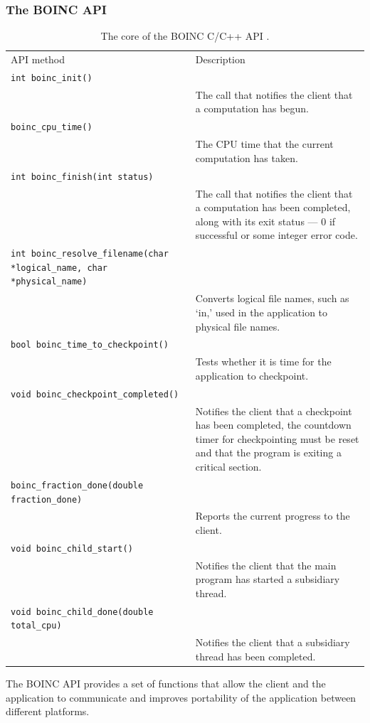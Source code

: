 \subsubsection{The BOINC API} \label{Bapi}
\begin{table}[htb] \centering
\caption{The core of the BOINC C/C++ API \cite{boincwiki}.}
\begin{tabular}{p{2.5cm}p{11.6cm}}\toprule
 API method & Description\\ \cmidrule(r){1-2}
 \verb|int boinc_init()|\\ & The call that notifies the client that a computation has begun.\\
\verb|boinc_cpu_time()| \\ & The CPU time that the current computation has taken.\\
\verb|int boinc_finish(int status)| \\ & The call that notifies the client that a computation has been completed, along with its exit status --- 0 if successful or some integer error code.\\
\verb|int boinc_resolve_filename(char *logical_name, char *physical_name)| \\ & Converts logical file names, such as `in,' used in the application to physical   file names. \\ 
\verb|bool boinc_time_to_checkpoint()| \\ & Tests whether it is time for the application to checkpoint.\\
\verb|void boinc_checkpoint_completed()| \\ & Notifies the client that a checkpoint has been completed, the countdown timer for checkpointing must be reset and that the program is exiting a critical section. 
\\ 
\verb|boinc_fraction_done(double fraction_done)| \\ & Reports the current progress to the client. \\ 
\verb|void boinc_child_start()| \\ & Notifies the client that the main program has started a subsidiary thread.\\
\verb|void boinc_child_done(double total_cpu)| \\ & Notifies the client that   a subsidiary thread has been completed. 
\\ \bottomrule
\end{tabular}\label{tab:api}
\end{table}
The BOINC API provides a set of functions that   allow the client and the application to communicate and   improves portability of the application between different platforms.
